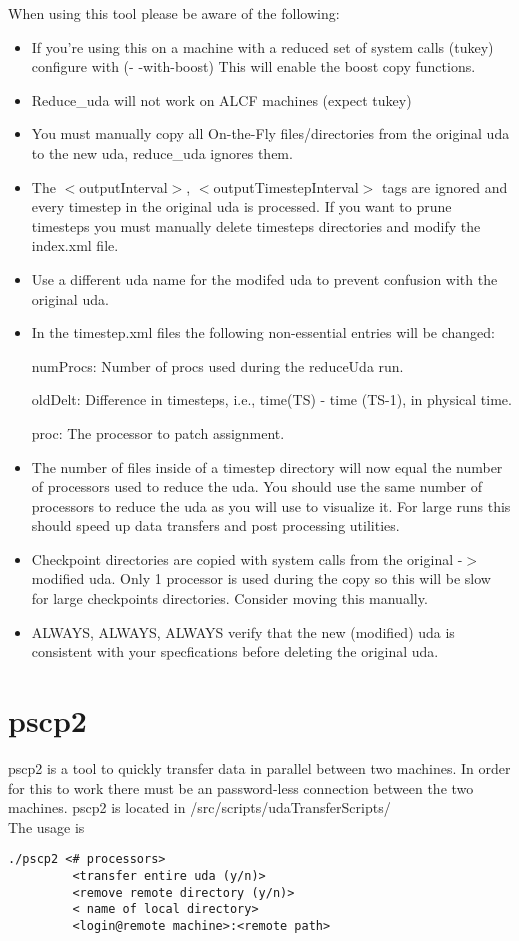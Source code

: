 When using this tool please be aware of the following:
\begin{itemize}
   \item If you're using this on a machine with a reduced set of system calls (tukey) configure with
          (- -with-boost)  This will enable the boost copy functions.
    \item Reduce\_uda will not work on ALCF machines (expect tukey)
    \item You must manually copy all On-the-Fly files/directories from the original uda
to the new uda, reduce\_uda ignores them.
    \item The $<$outputInterval$>$, $<$outputTimestepInterval$>$ tags are ignored and every
      timestep in the original uda is processed.  If you want to prune timesteps
      you must manually delete timesteps directories and modify the index.xml file.
    \item Use a different uda name for the modifed uda to prevent confusion with the original uda.
    \item In the timestep.xml files the following non-essential entries will be changed:
    
           numProcs:      Number of procs used during the reduceUda run.
           
           oldDelt:       Difference in timesteps, i.e., time(TS) - time (TS-1), in physical time.
           
           proc:          The processor to patch assignment.
    \item The number of files inside of a timestep directory will now equal the number of processors used to reduce the uda.
        You should use the same number of processors to reduce the uda as you will use to visualize it.
         For large runs this should speed up data transfers and post processing utilities.

    \item Checkpoint directories are copied with system calls from the original -$>$ modified uda.
      Only 1 processor is used during the copy so this will be slow for large checkpoints directories.
      Consider moving this manually.
    \item ALWAYS, ALWAYS, ALWAYS verify that the new (modified) uda is consistent
      with your specfications before deleting the original uda.
 \end{itemize}
\fi
\section{pscp2}
pscp2 is a tool to quickly transfer data in parallel between two machines. In order for this to work there must be an password-less connection between the two machines. pscp2 is located in /src/scripts/udaTransferScripts/
\\
The usage is 
\begin{Verbatim}[fontsize=\footnotesize]
 ./pscp2 <# processors> 
         <transfer entire uda (y/n)> 
         <remove remote directory (y/n)> 
         < name of local directory> 
         <login@remote machine>:<remote path>
\end{Verbatim}


